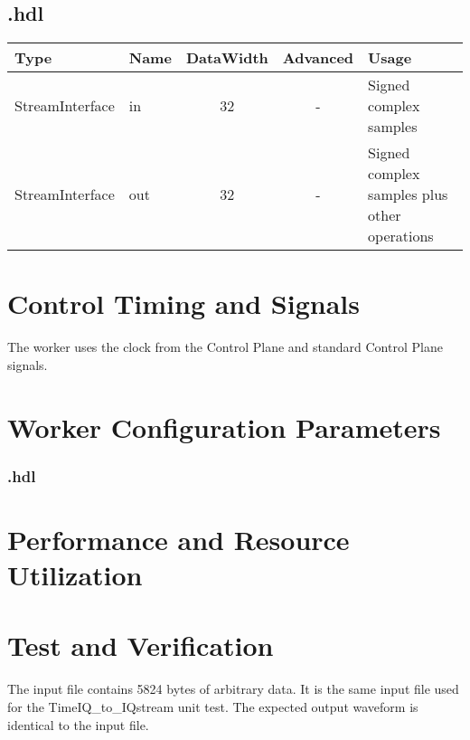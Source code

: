 \begin{landscape}
	\subsection*{\comp.hdl}
	\begin{scriptsize}
		\begin{tabular}{|M{2cm}|M{1.5cm}|c|c|M{12cm}|}
			\hline
			Type            & Name & DataWidth & Advanced   & Usage                                    		\\
			\hline
			StreamInterface & in   & 32        & - 			& Signed complex samples 						\\
			\hline
			StreamInterface & out  & 32        & - 			& Signed complex samples plus other operations	\\
			\hline
		\end{tabular}
	\end{scriptsize}
\end{landscape}

\section*{Control Timing and Signals}
\begin{flushleft}
	The \comp worker{} uses the clock from the Control Plane and standard Control Plane signals.\\
\end{flushleft}

\begin{landscape}
\section*{Worker Configuration Parameters}
\subsubsection*{\comp.hdl}
%
\section*{Performance and Resource Utilization}
%
\end{landscape}

\section*{Test and Verification}
\begin{flushleft}
	The input file contains 5824 bytes of arbitrary data. It is the same input file used for the TimeIQ\_to\_IQstream unit test. The expected output waveform is identical to the input file.
\end{flushleft}

